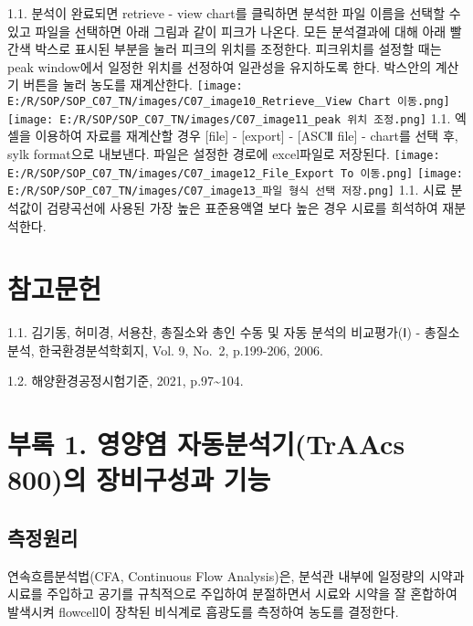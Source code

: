 \documentclass[
]{book}
\begin{document}
1.1. 분석이 완료되면 retrieve - view chart를 클릭하면 분석한 파일 이름을 선택할 수 있고 파일을 선택하면 아래 그림과 같이 피크가 나온다. 모든 분석결과에 대해 아래 빨간색 박스로 표시된 부분을 눌러 피크의 위치를 조정한다. 피크위치를 설정할 때는 peak window에서 일정한 위치를 선정하여 일관성을 유지하도록 한다. 박스안의 계산기 버튼을 눌러 농도를 재계산한다.
\texttt{[image: E:/R/SOP/SOP\_C07\_TN/images/C07\_image10\_Retrieve＿View Chart 이동.png]}
\texttt{[image: E:/R/SOP/SOP\_C07\_TN/images/C07\_image11\_peak 위치 조정.png]}
1.1. 엑셀을 이용하여 자료를 재계산할 경우 {[}file{]} - {[}export{]} - {[}ASCⅡ file{]} - chart를 선택 후, sylk format으로 내보낸다. 파일은 설정한 경로에 excel파일로 저장된다.
\texttt{[image: E:/R/SOP/SOP\_C07\_TN/images/C07\_image12\_File\_Export To 이동.png]}
\texttt{[image: E:/R/SOP/SOP\_C07\_TN/images/C07\_image13\_파일 형식 선택 저장.png]}
1.1. 시료 분석값이 검량곡선에 사용된 가장 높은 표준용액열 보다 높은 경우 시료를 희석하여 재분석한다.

\hypertarget{uxcc38uxace0uxbb38uxd5cc-4}{%
\section{참고문헌}\label{uxcc38uxace0uxbb38uxd5cc-4}}

1.1. 김기동, 허미경, 서용찬, 총질소와 총인 수동 및 자동 분석의 비교평가(Ⅰ) - 총질소분석, 한국환경분석학회지, Vol. 9, No.~2, p.199-206, 2006.

1.2. 해양환경공정시험기준, 2021, p.97\textasciitilde104.

\hypertarget{uxbd80uxb85d-1.-uxc601uxc591uxc5fc-uxc790uxb3d9uxbd84uxc11duxae30traacs-800uxc758-uxc7a5uxbe44uxad6cuxc131uxacfc-uxae30uxb2a5}{%
\section{부록 1. 영양염 자동분석기(TrAAcs 800)의 장비구성과 기능}\label{uxbd80uxb85d-1.-uxc601uxc591uxc5fc-uxc790uxb3d9uxbd84uxc11duxae30traacs-800uxc758-uxc7a5uxbe44uxad6cuxc131uxacfc-uxae30uxb2a5}}

\hypertarget{uxce21uxc815uxc6d0uxb9ac-2}{%
\subsection{측정원리}\label{uxce21uxc815uxc6d0uxb9ac-2}}

연속흐름분석법(CFA, Continuous Flow Analysis)은, 분석관 내부에 일정량의 시약과 시료를 주입하고 공기를 규칙적으로 주입하여 분절하면서 시료와 시약을 잘 혼합하여 발색시켜 flowcell이 장착된 비식계로 흡광도를 측정하여 농도를 결정한다.
\end{document}
